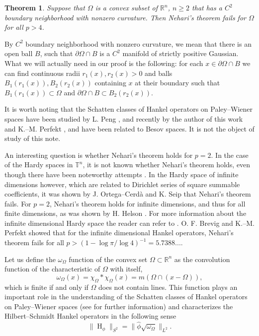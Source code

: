 \documentclass[footinclude=true]{amsart}
\theoremstyle{plain}
\newtheorem{theo}{Theorem}[section]
\DeclareMathOperator{\Ha}{H}
\begin{document}
	\begin{theo}\label{ball}
		Suppose that $\Omega$ is a convex subset of $\mathbb{R}^{n}$, $n\geq 2$ that has a $C^{2}$ boundary neighborhood with nonzero curvature. Then Nehari's theorem fails for $\Omega$ for all $p>4$.
	\end{theo}
    By $C^{2}$ boundary neighborhood with nonzero curvature, we mean that there is an open ball $B$, such that $\partial \Omega\cap B$ is a $C^2$ manifold of strictly positive Gaussian. What we will actually need in our proof is the following: for each $x\in\partial \Omega\cap B$ we can find continuous radii $r_1(x),r_2(x)>0$ and balls $B_1(r_1(x)),B_2(r_2(x))$ containing $x$ at their boundary such that $B_1(r_1(x))\subset \Omega$ and $\partial\Omega\cap B\subset B_2(r_2(x))$.
    \par It is worth noting that the Schatten classes of Hankel operators on Paley--Wiener spaces have been studied by L. Peng \cite{MR953994, MR1001657}, and recently by the author of this work and K.--M. Perfekt \cite{bampouras2024besovspacesschattenclass}, and have been related to Besov spaces. It is not the object of study of this note.
	\par An interesting question is whether Nehari's theorem holds for $p=2$. In the case of the Hardy spaces in $\mathbb{T}^n$, it is not known whether Nehari's theorem holds, even though there have been noteworthy attempts \cite{MR1961195,MR1785283,MR766959}. In the Hardy space of infinite dimensions however, which are related to Dirichlet series of square summable coefficients, it was shown by J. Ortega--Cerd\`{a} and K. Seip \cite{MR2993031} that Nehari's theorem fails. For $p=2$, Nehari's theorem holds for infinite dimensions, and thus for all finite dimensions, as was shown by H. Helson \cite{MR2263964}. For more information about the infinite dimensional Hardy space the reader can refer to \cite[Chapter 4]{MR3099268}. O. F. Brevig and K.--M. Perfekt \cite{MR3422087} showed that for the infinite dimensional Hankel operators, Nehari's theorem fails for all $p>(1-\log\pi/\log 4)^{-1}= 5.7388...$.
	\par 
	Let us define the $\omega_{\Omega}$ function of the convex set $\Omega\subset\mathbb{R}^{n}$ as the convolution function of the characteristic of $\Omega$ with itself, 
	$$\omega_{\Omega}(x)=\chi_{\Omega}\ast\chi_{\Omega}(x)=m(\Omega\cap(x-\Omega)),$$ which is finite if and only if $\Omega$ does not contain lines. This function plays an important role in the understanding of the Schatten classes of Hankel operators on Paley--Wiener spaces (see \cite{bampouras2024besovspacesschattenclass} for further information) and characterizes the Hilbert--Schmidt Hankel operators in the following sense $$\|\Ha_{\phi}\|_{S^{2}}=\|\widehat{\phi}\sqrt{\omega_{\Omega}}\|_{L^{2}}.$$
\end{document}

